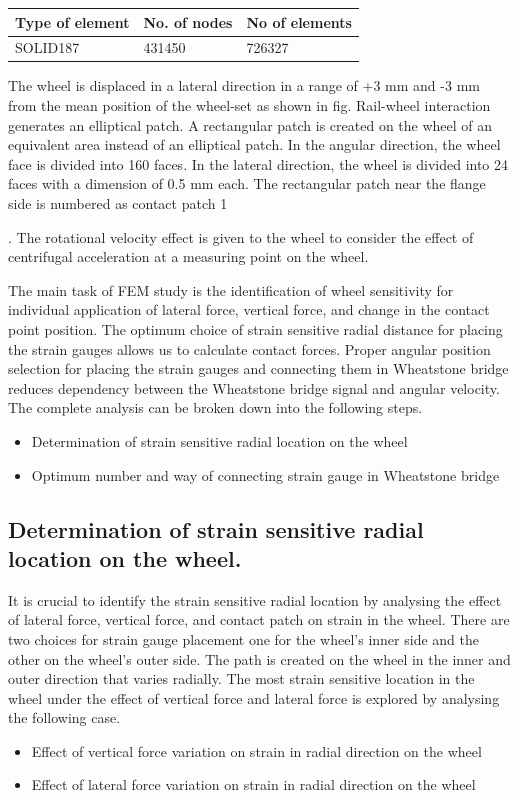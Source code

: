 \documentclass[]{interact}
\theoremstyle{plain}%
\theoremstyle{definition}
\theoremstyle{remark}
\begin{document}
\begin{table}[h]
{\begin{tabular}{lll}
\toprule
 Type of element & No. of nodes & No of elements  \\ 
 \midrule
SOLID187 &	431450 &	726327  \\
 
\bottomrule
\end{tabular}}
\label{tab2}
\end{table}

The wheel is displaced in a lateral direction in a range of +3 mm and -3 mm from the mean position of the wheel-set as shown in fig. Rail-wheel interaction generates an elliptical patch. A rectangular patch is created on the wheel of an equivalent area instead of an elliptical patch.  In the angular direction, the wheel face is divided into 160 faces. In the lateral direction, the wheel is divided into 24 faces with a dimension of 0.5 mm each. The rectangular patch near the flange side is numbered as contact patch 1

.  The rotational velocity effect is given to the wheel to consider the effect of centrifugal acceleration at a measuring point on the wheel. 

The main task of FEM study is the identification of wheel sensitivity for individual application of lateral force, vertical force, and change in the contact point position. The optimum choice of strain sensitive radial distance for placing the strain gauges allows us to calculate contact forces. Proper angular position selection for placing the strain gauges and connecting them in Wheatstone bridge reduces dependency between the Wheatstone bridge signal and angular velocity. 
The complete analysis can be broken down into the following steps.
\begin{itemize}
\item Determination of strain sensitive radial location on the wheel
\item  Optimum number and way of connecting strain gauge in Wheatstone bridge
\end{itemize}
\subsection{Determination of strain sensitive radial location on the wheel.}
It is crucial to identify the strain sensitive radial location by analysing the effect of lateral force, vertical force, and contact patch on strain in the wheel. There are two choices for strain gauge placement one for the wheel’s inner side and the other on the wheel’s outer side. The path is created on the wheel in the inner and outer direction that varies radially. The most strain sensitive location in the wheel under the effect of vertical force and lateral force is explored by analysing the following case.
\begin{itemize}
\item Effect of vertical force variation on strain in radial direction on the wheel
\item  Effect of lateral force variation on strain in radial direction on the wheel
\end{itemize}
\end{document}
